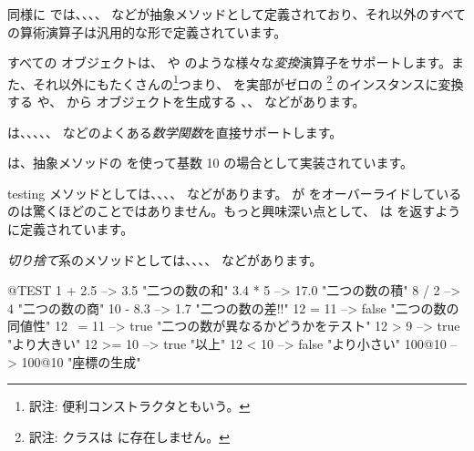 \documentclass[a4paper,10pt,twoside]{book}
\begin{document}
同様に  では、、、、 などが抽象メソッドとして定義されており、それ以外のすべての算術演算子は汎用的な形で定義されています。

すべての  オブジェクトは、 や  のような様々な\emph{変換}演算子をサポートします。また、それ以外にもたくさんの\footnote{訳注: 便利コンストラクタともいう。}つまり、 を実部がゼロの \footnote{訳注:  クラスは  に存在しません。} のインスタンスに変換する  や、 から  オブジェクトを生成する 、、 などがあります。

 は、、、、、 などのよくある\emph{数学関数}を直接サポートします。

 は、抽象メソッドの  を使って基数 10 の場合として実装されています。

testing メソッドとしては、、、、 などがあります。 が  をオーバーライドしているのは驚くほどのことではありません。もっと興味深い点として、 は  を返すように定義されています。

\emph{切り捨て}系のメソッドとしては、、、、 などがあります。

\begin{code}{@TEST}
1 + 2.5     --> 3.5             "二つの数の和"
3.4 * 5      --> 17.0           "二つの数の積"
8 / 2         --> 4                 "二つの数の商"
10 - 8.3   --> 1.7              "二つの数の差!\footnotemark!"
12 = 11    --> false           "二つの数の同値性"
12 ~= 11 --> true            "二つの数が異なるかどうかをテスト"
12 > 9      --> true            "より大きい"
12 >= 10  --> true            "以上"
12 < 10    --> false           "より小さい"
100@10   --> 100@10    "座標の生成"
\end{code}
\end{document}
